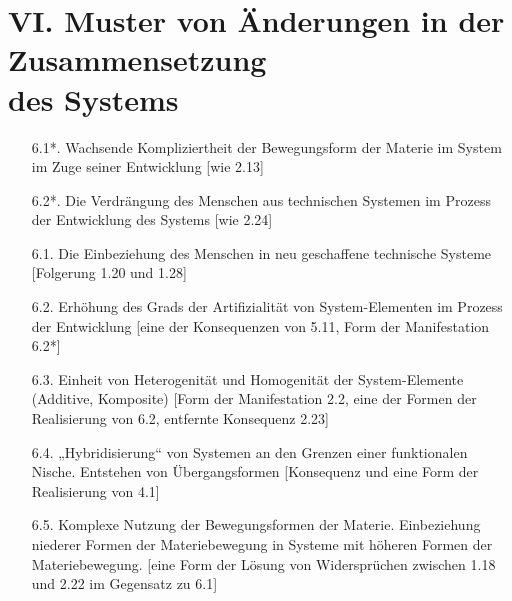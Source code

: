 \documentclass[11pt,a4paper]{article}
\begin{document}
\section*{VI. Muster von Änderungen in der Zusammensetzung\\ des Systems}
\begin{itemize}
\item[6.1*.] Wachsende Kompliziertheit der Bewegungsform der Materie im System
  im Zuge seiner Entwicklung [wie 2.13]
\item[6.2*.] Die Verdrängung des Menschen aus technischen Systemen im Prozess
  der Entwicklung des Systems [wie 2.24]
\item[6.1.] Die Einbeziehung des Menschen in neu geschaffene technische
  Systeme [Folgerung 1.20 und 1.28]
\item[6.2.] Erhöhung des Grads der Artifizialität von System-Elementen im
  Prozess der Entwicklung [eine der Konsequenzen von 5.11, Form der
    Manifestation 6.2*]
\item[6.3.] Einheit von Heterogenität und Homogenität der System-Elemente
  (Additive, Komposite) [Form der Manifestation 2.2, eine der Formen der
  Realisierung von 6.2, entfernte Konsequenz 2.23]
\item[6.4.] „Hybridisierung“ von Systemen an den Grenzen einer funktionalen
  Nische.  Entstehen von Übergangsformen [Konsequenz und eine Form der
    Realisierung von 4.1]
\item[6.5.] Komplexe Nutzung der Bewegungsformen der Materie. Einbeziehung
  niederer Formen der Materiebewegung in Systeme mit höheren Formen der
  Materiebewegung.  [eine Form der Lösung von Widersprüchen zwischen 1.18 und
    2.22 im Gegensatz zu 6.1]
\end{itemize}
\end{document}
